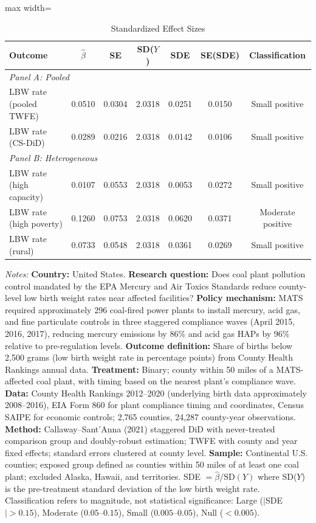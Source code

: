 \begin{table}[t]
\centering
\caption{Standardized Effect Sizes}
\label{tab:sde}
\begin{adjustbox}{max width=\textwidth}
\begin{tabular}{lcccccc}
\toprule
Outcome & $\hat{\beta}$ & SE & SD($Y$) & SDE & SE(SDE) & Classification \\
\midrule
\multicolumn{7}{l}{\textit{Panel A: Pooled}} \\
LBW rate (pooled TWFE) & 0.0510 & 0.0304 & 2.0318 & 0.0251 & 0.0150 & Small positive \\
LBW rate (CS-DiD) & 0.0289 & 0.0216 & 2.0318 & 0.0142 & 0.0106 & Small positive \\
\midrule
\multicolumn{7}{l}{\textit{Panel B: Heterogeneous}} \\
LBW rate (high capacity) & 0.0107 & 0.0553 & 2.0318 & 0.0053 & 0.0272 & Small positive \\
LBW rate (high poverty) & 0.1260 & 0.0753 & 2.0318 & 0.0620 & 0.0371 & Moderate positive \\
LBW rate (rural) & 0.0733 & 0.0548 & 2.0318 & 0.0361 & 0.0269 & Small positive \\
\bottomrule
\end{tabular}
\end{adjustbox}
\begin{tablenotes}
\item \textit{Notes:} \textbf{Country:} United States. \textbf{Research question:} Does coal plant pollution control mandated by the EPA Mercury and Air Toxics Standards reduce county-level low birth weight rates near affected facilities? \textbf{Policy mechanism:} MATS required approximately 296 coal-fired power plants to install mercury, acid gas, and fine particulate controls in three staggered compliance waves (April 2015, 2016, 2017), reducing mercury emissions by 86\% and acid gas HAPs by 96\% relative to pre-regulation levels. \textbf{Outcome definition:} Share of births below 2,500 grams (low birth weight rate in percentage points) from County Health Rankings annual data. \textbf{Treatment:} Binary; county within 50 miles of a MATS-affected coal plant, with timing based on the nearest plant's compliance wave. \textbf{Data:} County Health Rankings 2012--2020 (underlying birth data approximately 2008--2016), EIA Form 860 for plant compliance timing and coordinates, Census SAIPE for economic controls; 2,765 counties, 24,287 county-year observations. \textbf{Method:} Callaway--Sant'Anna (2021) staggered DiD with never-treated comparison group and doubly-robust estimation; TWFE with county and year fixed effects; standard errors clustered at county level. \textbf{Sample:} Continental U.S. counties; exposed group defined as counties within 50 miles of at least one coal plant; excluded Alaska, Hawaii, and territories. SDE $= \hat{\beta} / \text{SD}(Y)$ where SD($Y$) is the pre-treatment standard deviation of the low birth weight rate. Classification refers to magnitude, not statistical significance: Large ($|$SDE$| > 0.15$), Moderate ($0.05$--$0.15$), Small ($0.005$--$0.05$), Null ($< 0.005$).
\end{tablenotes}
\end{table}

